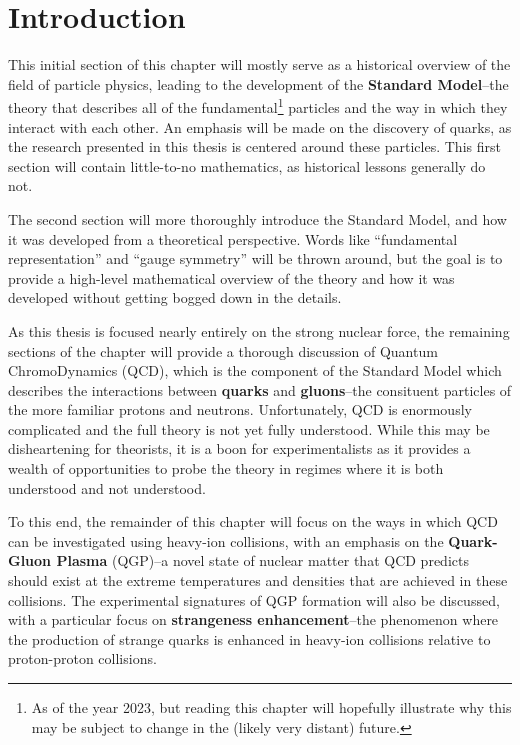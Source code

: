 \chapter{Introduction}

This initial section of this chapter will mostly serve as a historical overview of the field of particle physics, leading to the development of the \textbf{Standard Model}--the theory that describes all of the fundamental\footnote{As of the year 2023, but reading this chapter will hopefully illustrate why this may be subject to change in the (likely very distant) future.} particles and the way in which they interact with each other. An emphasis will be made on the discovery of quarks, as the research presented in this thesis is centered around these particles. This first section will contain little-to-no mathematics, as historical lessons generally do not. 

The second section will more thoroughly introduce the Standard Model, and how it was developed from a theoretical perspective. Words like ``fundamental representation'' and ``gauge symmetry'' will be thrown around, but the goal is to provide a high-level mathematical overview of the theory and how it was developed without getting bogged down in the details.

As this thesis is focused nearly entirely on the strong nuclear force, the remaining sections of the chapter will provide a thorough discussion of Quantum ChromoDynamics (QCD), which is the component of the Standard Model which describes the interactions between \textbf{quarks} and \textbf{gluons}--the consituent particles of the more familiar protons and neutrons. Unfortunately, QCD is enormously complicated and the full theory is not yet fully understood. While this may be disheartening for theorists, it is a boon for experimentalists as it provides a wealth of opportunities to probe the theory in regimes where it is both understood and not understood. 

To this end, the remainder of this chapter will focus on the ways in which QCD can be investigated using heavy-ion collisions, with an emphasis on the \textbf{Quark-Gluon Plasma} (QGP)--a novel state of nuclear matter that QCD predicts should exist at the extreme temperatures and densities that are achieved in these collisions. The experimental signatures of QGP formation will also be discussed, with a particular focus on \textbf{strangeness enhancement}--the phenomenon where the production of strange quarks is enhanced in heavy-ion collisions relative to proton-proton collisions. 

